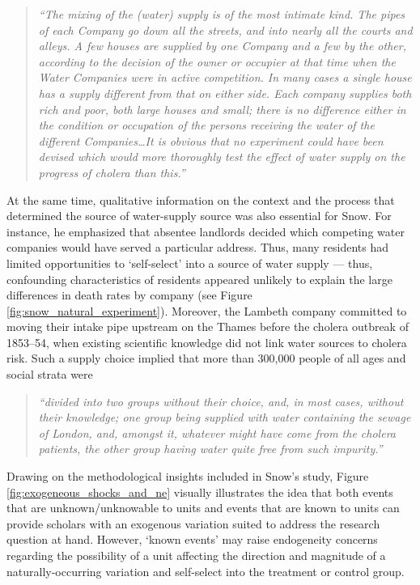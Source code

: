 \begin{refsection}
\begin{quote}
  \textit{
  ``The mixing of the (water) supply is of the most intimate kind. The pipes of
  each Company go down all the streets, and into nearly all the courts and
  alleys. A few houses are supplied by one Company and a few by the other,
  according to the decision of the owner or occupier at that time when the Water
  Companies were in active competition. In many cases a single house has a
  supply different from that on either side. Each company supplies both rich and
  poor, both large houses and small; there is no difference either in the
  condition or occupation of the persons receiving the water of the different
  Companies\ldots It is obvious that no experiment could have been devised which
  would more thoroughly test the effect of water supply on the progress of
  cholera than this.''
  }
  \autocite[][pages 74 - 75]{snow_1855}
\end{quote}

At the same time, qualitative information on the context and the process that
determined the source of water-supply source was also essential for Snow.  For
instance, he emphasized that absentee landlords decided which competing water
companies would have served a particular address.  Thus, many residents had
limited opportunities to `self-select' into a source of water supply --- thus,
confounding characteristics of residents appeared unlikely to explain the large
differences in death rates by company (see Figure
\ref{fig:snow_natural_experiment}).  Moreover,  the Lambeth company committed to
moving their intake pipe upstream on the Thames before the cholera outbreak of
1853–54, when existing scientific knowledge did not link water sources to
cholera risk.  Such a supply choice implied that more than 300,000 people of 
all ages and social strata were

\begin{quote}
  \textit{``divided into two groups without their choice, and, in most cases, 
  without their knowledge; one group being supplied with water containing the 
  sewage of London, and, amongst it, whatever might have come from the cholera 
  patients, the other group having water quite free from such impurity.''}
  \autocite[][pages 74–75]{snow_1855}
\end{quote}

Drawing on the methodological insights included in Snow's study, Figure 
\ref{fig:exogeneous_shocks_and_ne} visually illustrates the idea that both
events that are unknown/unknowable to units and events that are known to units
can provide scholars with an exogenous variation suited to address the research 
question at hand.  However, `known events' may raise endogeneity concerns
regarding the possibility of a unit affecting the direction and magnitude of a
naturally-occurring variation and self-select into the treatment or control
group.


\end{refsection}
